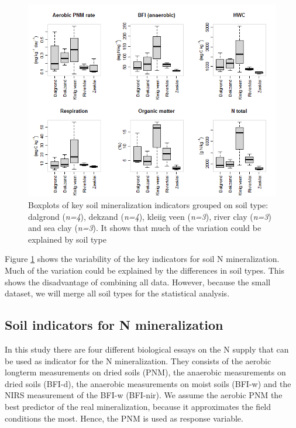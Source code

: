 \documentclass[10pt,twoside,dutch,english]{report}
\begin{document}
	\begin{figure}[ht] %
		
		\centering
		\includegraphics[width=1\linewidth]{results_boxplots}
		\caption{Boxplots of key soil mineralization indicators grouped on soil type: dalgrond (\textit{n=4}), dekzand (\textit{n=4}), kleiig veen (\textit{n=3}), river clay (\textit{n=3}) and sea clay (\textit{n=3}). It shows  that much of the variation could be explained by soil type}
		\label{fig:results_boxplots}
	\end{figure}
Figure \ref{fig:results_boxplots} shows the variability of the key indicators for soil N mineralization. Much of the variation could be explained by the differences in soil types. This shows the disadvantage of combining all data. However, because the small dataset, we will merge all soil types for the statistical analysis.

\subsection{Soil indicators for N mineralization} 
In this study there are four different biological essays on the N supply that can be used as indicator for the N mineralization. They consists of the aerobic longterm measurements on dried soils (PNM), the anaerobic measurements on dried soils (BFI-d), the anaerobic measurements on moist soils (BFI-w) and the NIRS measurement of the BFI-w (BFI-nir). We assume the aerobic PNM the best predictor of the real mineralization, because it approximates the field conditions the most. Hence, the PNM is used as response variable. 
\end{document}
